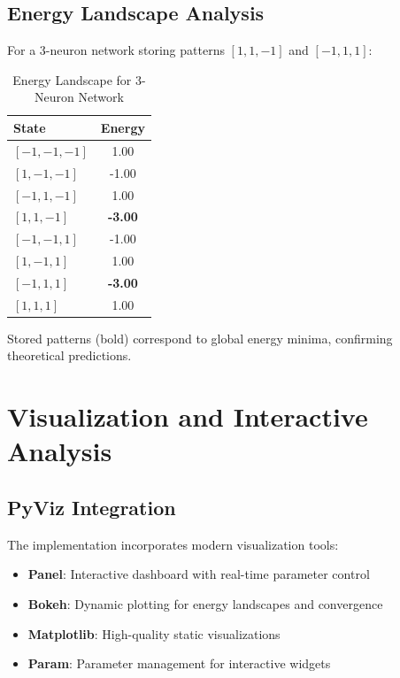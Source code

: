 \documentclass[11pt,a4paper]{article}
\begin{document}
\subsection{Energy Landscape Analysis}

For a 3-neuron network storing patterns $[1, 1, -1]$ and $[-1, 1, 1]$:

\begin{table}[H]
\centering
\caption{Energy Landscape for 3-Neuron Network}
\begin{tabular}{@{}lc@{}}
\toprule
State & Energy \\
\midrule
$[-1, -1, -1]$ & 1.00 \\
$[1, -1, -1]$ & -1.00 \\
$[-1, 1, -1]$ & 1.00 \\
$[1, 1, -1]$ & \textbf{-3.00} \\
$[-1, -1, 1]$ & -1.00 \\
$[1, -1, 1]$ & 1.00 \\
$[-1, 1, 1]$ & \textbf{-3.00} \\
$[1, 1, 1]$ & 1.00 \\
\bottomrule
\end{tabular}
\label{tab:energy}
\end{table}

Stored patterns (bold) correspond to global energy minima, confirming theoretical predictions.

\section{Visualization and Interactive Analysis}

\subsection{PyViz Integration}

The implementation incorporates modern visualization tools:

\begin{itemize}
    \item \textbf{Panel}: Interactive dashboard with real-time parameter control
    \item \textbf{Bokeh}: Dynamic plotting for energy landscapes and convergence
    \item \textbf{Matplotlib}: High-quality static visualizations
    \item \textbf{Param}: Parameter management for interactive widgets
\end{itemize}
\end{document}
